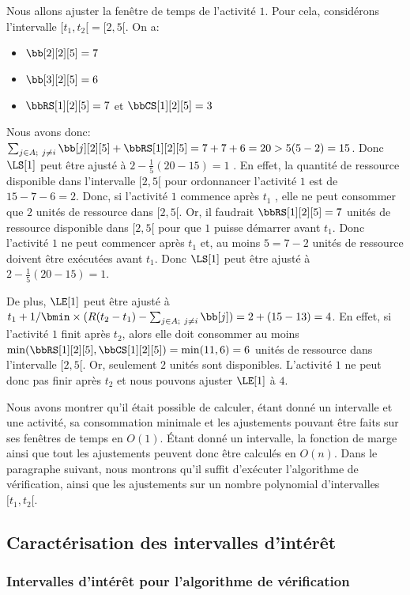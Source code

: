 \begin{ex}
Nous allons ajuster la fenêtre de temps de l'activité $1$. Pour cela,
considérons l'intervalle $[t_1,t_2[=[2,5[$. On a:
\begin{itemize}
  \item $\bb[2][2][5]=7$
  \item $\bb[3][2][5]=6$
  \item $\bbRS[1][2][5]=7$ et $\bbCS[1][2][5]=3$
  \end{itemize}
Nous avons donc: $\sum_{j\in A;\ j\neq i} \bb[j][2][5] +
\bbRS[1][2][5]= 7+7+6 =20 > 5 (5-2) =15$. Donc $\LS[1]$ peut être ajusté
à $ 2 -\frac{1}{5} (20-15) = 1$ .
En effet, la quantité de ressource disponible dans l'intervalle
$[2,5[$ pour ordonnancer l'activité $1$ est de $15-7-6=2$. Donc, si
l'activité $1$ commence après $t_1$ , elle ne peut consommer que $2$
unités de ressource dans $[2,5[$.  Or, il faudrait $\bbRS[1][2][5]= 7$
unités de ressource disponible dans $[2,5[$ pour que $1$ puisse
démarrer avant $t_1$. Donc l'activité $1$ ne peut commencer après $t_1$
et, au moins $5= 7-2$ unités de ressource doivent être exécutées avant
$t_1$. Donc $\LS[1]$ peut être ajusté à $2 - \frac{1}{5}(20-15) =1 $.

De plus, $\LE[1]$ peut être ajusté à $t_1 + 1/ \bmin \times (R(t_2-t_1) -
\sum_{j\in A;\ j\neq i} \bb[j] )= 2+(15-13)=4$. En effet, si l'activité
$1$ finit après $t_2$, alors elle doit consommer au moins
$\min(\bbRS[1][2][5],\bbCS[1][2][5])=\min(11,6)=6$ unités de ressource
dans l'intervalle $[2,5[$. Or, seulement $2$ unités sont
disponibles. L'activité $1$ ne peut donc pas finir après $t_2$ et nous
pouvons ajuster $\LE[1]$ à $4$.
\end{ex}

Nous avons montrer qu'il était possible de calculer, étant donné un
intervalle et une activité, sa consommation minimale et les
ajustements pouvant être faits sur ses fenêtres de temps en
$O(1)$. {\'E}tant donné un intervalle, la fonction de marge ainsi que
tout les ajustements peuvent donc être calculés en $O(n)$. Dans le
paragraphe suivant, nous montrons qu'il suffit d'exécuter l'algorithme
de vérification, ainsi que les ajustements sur un nombre polynomial
d'intervalles $[t_1,t_2[$.

\subsection{Caractérisation des intervalles d'intérêt}

\subsubsection{Intervalles d'intérêt pour l'algorithme de
  vérification}

